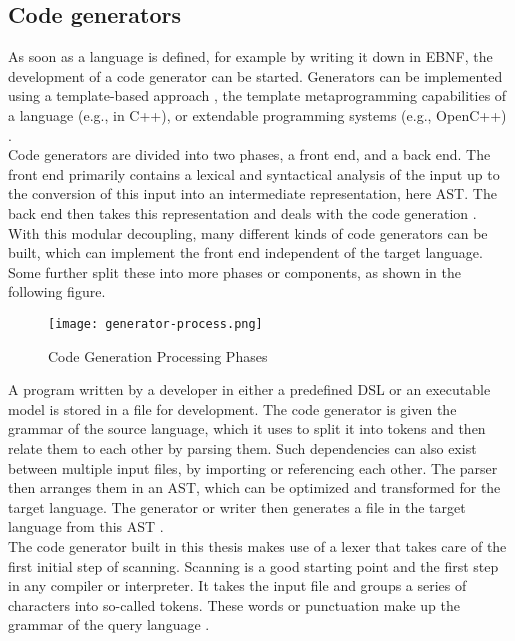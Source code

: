 \subsection{Code generators}
As soon as a language is defined, for example by writing it down in \ac{EBNF}, the development of a code generator can be started. Generators can be implemented using a template-based approach \parencite[see][]{cleaveland_program_2001}, the template metaprogramming capabilities of a language (e.g., in C++), or extendable programming systems (e.g., OpenC++) \parencite[cf.][p. 16]{czarnecki_generative_2000}.\\
Code generators are divided into two phases, a front end, and a back end. The front end primarily contains a lexical and syntactical analysis of the input up to the conversion of this input into an intermediate representation, here \ac{AST}. The back end then takes this representation and deals with the code generation \parencite[cf.][p. 7]{wirth_compiler_1996}. With this modular decoupling, many different kinds of code generators can be built, which can implement the front end independent of the target language.\\
Some further split these into more phases or components, as shown in the following figure.
\begin{figure}[H]
    \caption{Code Generation Processing Phases}
    \label{fig:generator-process}
    \texttt{[image: generator-process.png]}
    \\
    \cite[Source: Based on][p. 5]{sarkar_code_2001}
\end{figure}
A program written by a developer in either a predefined \ac{DSL} or an executable model is stored in a file for development. The code generator is given the grammar of the source language, which it uses to split it into tokens and then relate them to each other by parsing them. Such dependencies can also exist between multiple input files, by importing or referencing each other. The parser then arranges them in an \ac{AST}, which can be optimized and transformed for the target language. The generator or writer then generates a file in the target language from this \ac{AST} \parencite[cf.][pp. 5-6]{sarkar_code_2001}.\\
The code generator built in this thesis makes use of a lexer that takes care of the first initial step of scanning. Scanning is a good starting point and the first step in any compiler or interpreter. It takes the input file and groups a series of characters into so-called tokens. These words or punctuation make up the grammar of the query language \parencite[cf.][p. 39]{nystrom_crafting_2021}.\\
